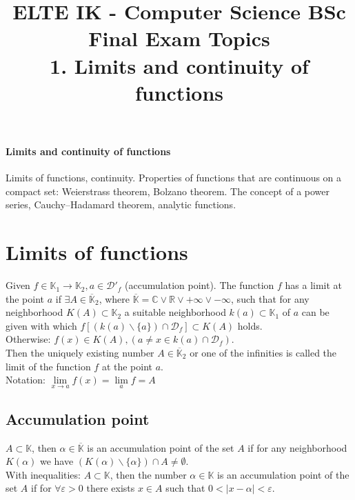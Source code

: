 \documentclass[margin=0px]{article}
\title{\textbf{{\Large ELTE IK - Computer Science BSc} \vspace{0.2cm} \\ {\huge Final Exam Topics}} \vspace{0.3cm} \\ 1. Limits and continuity of functions}
\author{}
\date{}
\newenvironment{tetel}[1]{\paragraph{#1 \\}}{}
\begin{document}
\maketitle

\begin{center}
\end{center}

\begin{tetel}{Limits and continuity of functions}
    Limits of functions, continuity. Properties of functions that are continuous on a compact set: Weierstrass theorem, Bolzano theorem. The concept of a power series, Cauchy--Hadamard theorem, analytic functions.
\end{tetel}

\section{Limits of functions}

Given $f \in \mathbb{K}_{1} \to \mathbb{K}_{2}, a \in \mathcal{D}'_{f}$ (accumulation point). The function $f$ has a limit at the point $a$ if $\exists A \in \overline{\mathbb{K}}_{2}$, where $\overline{\mathbb{K}} = \mathbb{C} \vee \mathbb{R} \vee +\infty \vee -\infty$, such that for any neighborhood $K(A) \subset \mathbb{K}_{2}$ a suitable neighborhood $k(a) \subset \mathbb{K}_{1}$ of $a$ can be given with which $f[(k(a) \backslash \{a\}) \cap \mathcal{D}_{f}] \subset K(A)$ holds. \\
Otherwise: $f(x) \in K(A), (a \neq x \in k(a) \cap \mathcal{D}_{f})$. \\
Then the uniquely existing number $A \in \overline{\mathbb{K}}_{2}$ or one of the infinities is called the limit of the function $f$ at the point $a$. \\
Notation: $\lim\limits_{x \to a}{f(x)} = \lim\limits_{a}{f} = A$

\subsection{Accumulation point}

$A \subset \mathbb{K}$, then $\alpha \in \overline{\mathbb{K}}$ is an accumulation point of the set $A$ if for any neighborhood $K(\alpha)$ we have $(K(\alpha) \backslash \{\alpha\}) \cap A \neq \emptyset$. \\
With inequalities: $A \subset \mathbb{K}$, then the number $\alpha \in \mathbb{K}$ is an accumulation point of the set $A$ if for $\forall \varepsilon > 0$ there exists $x \in A$ such that $0 < |x-\alpha| < \varepsilon$.
\end{document}
